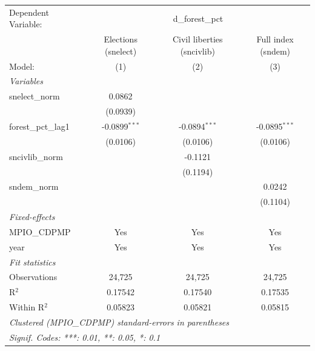 
\begingroup
\centering
\begin{tabular}{lccc}
   \tabularnewline \midrule \midrule
   Dependent Variable: & \multicolumn{3}{c}{d\_forest\_pct}\\
                       & Elections (snelect) & Civil liberties (sncivlib) & Full index (sndem) \\   
   Model:              & (1)                 & (2)                        & (3)\\  
   \midrule
   \emph{Variables}\\
   snelect\_norm       & 0.0862              &                            &   \\   
                       & (0.0939)            &                            &   \\   
   forest\_pct\_lag1   & -0.0899$^{***}$     & -0.0894$^{***}$            & -0.0895$^{***}$\\   
                       & (0.0106)            & (0.0106)                   & (0.0106)\\   
   sncivlib\_norm      &                     & -0.1121                    &   \\   
                       &                     & (0.1194)                   &   \\   
   sndem\_norm         &                     &                            & 0.0242\\   
                       &                     &                            & (0.1104)\\   
   \midrule
   \emph{Fixed-effects}\\
   MPIO\_CDPMP         & Yes                 & Yes                        & Yes\\  
   year                & Yes                 & Yes                        & Yes\\  
   \midrule
   \emph{Fit statistics}\\
   Observations        & 24,725              & 24,725                     & 24,725\\  
   R$^2$               & 0.17542             & 0.17540                    & 0.17535\\  
   Within R$^2$        & 0.05823             & 0.05821                    & 0.05815\\  
   \midrule \midrule
   \multicolumn{4}{l}{\emph{Clustered (MPIO\_CDPMP) standard-errors in parentheses}}\\
   \multicolumn{4}{l}{\emph{Signif. Codes: ***: 0.01, **: 0.05, *: 0.1}}\\
\end{tabular}
\par\endgroup


